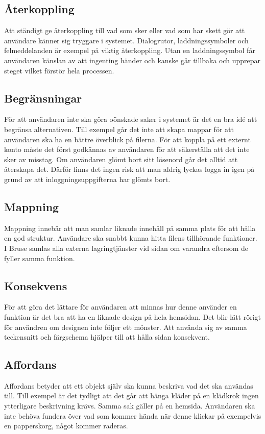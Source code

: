 \documentclass[a4paper,12pt,oneside,final]{extbook}
\begin{document}
\subsection{Återkoppling}
Att ständigt ge återkoppling till vad som sker eller vad som har skett gör att användare känner sig tryggare i systemet. Dialogrutor, laddningssymboler och felmeddelanden är exempel på viktig återkoppling\cite{norman}. Utan en laddningssymbol får användaren känslan av att ingenting händer och kanske går tillbaka och upprepar steget vilket förstör hela processen.

\subsection{Begränsningar}
För att användaren inte ska göra oönskade saker i systemet är det en bra idé att begränsa alternativen\cite{norman}. Till exempel går det inte att skapa mappar för att användaren ska ha en bättre överblick på filerna. För att koppla på ett externt konto måste det först godkännas av användaren för att säkerställa att det inte sker av misstag. Om användaren glömt bort sitt lösenord går det alltid att återskapa det. Därför finns det ingen risk att man aldrig lyckas logga in igen på grund av att inloggningsuppgifterna har glömts bort.

\subsection{Mappning}
Mappning innebär att man samlar liknade innehåll på samma plats för att hålla en god struktur\cite{norman}. Användare ska snabbt kunna hitta filens tillhörande funktioner. I Bruse samlas alla externa lagringtjänster vid sidan om varandra eftersom de fyller samma funktion.

\subsection{Konsekvens}
För att göra det lättare för användaren att minnas hur denne använder en funktion är det bra att ha en liknade design på hela hemsidan. Det blir lätt rörigt för användren om designen inte följer ett mönster. Att använda sig av samma teckensnitt och färgschema hjälper till att hålla sidan konsekvent\cite{norman}.

\subsection{Affordans}
Affordans betyder att ett objekt själv ska kunna beskriva vad det ska användas till. Till exempel är det tydligt att det går att hänga kläder på en klädkrok\cite{norman} ingen ytterligare beskrivning krävs. Samma sak gäller på en hemsida. Användaren ska inte behöva fundera över vad som kommer hända när denne klickar på exempelvis en papperskorg, något kommer raderas.
\end{document}

